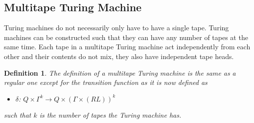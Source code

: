 \documentclass[12pt, letterpaper]{article}
\newtheorem*{defn}{Definition}
\begin{document}
\subsection{Multitape Turing Machine}
Turing machines do not necessarily only have to have a single tape. Turing machines can be constructed such that they can have any number of tapes at the same time. Each tape in a multitape Turing machine act independently from each other and their contents do not mix, they also have independent tape heads. 
\begin{defn}
The definition of a multitape Turing machine is the same as a regular one except for the transition function as it is now defined as 
\begin{itemize}
\item $\delta$: $Q \times \Gamma^k \rightarrow Q \times (\Gamma \times (RL))^k$
\end{itemize}
such that $k$ is the number of tapes the Turing machine has.
\end{defn} \cite{siu}
\end{document}
